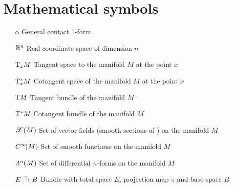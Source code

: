 \section*{Mathematical symbols}
\begin{itemize}[itemsep=0pt, leftmargin=2cm, labelsep=0cm, labelwidth=1.9cm, align=left]
    \item[$\alpha$] General contact 1-form
%
%
    \item[$\mathbb{R}^n$] Real coordinate space of dimension $n$
%
%
    \item[$\mathrm{T}_{x}M$]  Tangent space to the manifold $M$ at the point $x$
    \item[$\mathrm{T}_{x}^*M$]  Cotangent space of the manifold $M$ at the point $x$
    \item[$\mathrm{T}M$]  Tangent bundle of the manifold $M$
    \item[$\mathrm{T}^*M$]  Cotangent bundle of the manifold $M$
    \item[$\mathscr{X}\qty(M)$]  Set of vector fields (smooth sections of ) on the manifold $M$
    \item[$C^\infty\!\qty(M)$]  Set of smooth functions on the manifold $M$
    \item[$\Lambda^{n}(M)$]  Set of differential $n$-forms on the manifold $M$
    \item[$E\xrightarrow[]{\pi}B$]  Bundle with total space $E$, projection map $\pi$ and base space $B$
\end{itemize}